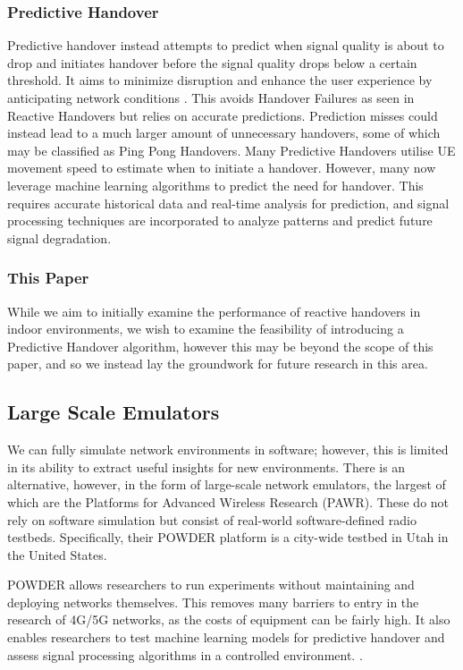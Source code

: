 \subsubsection*{Predictive Handover} Predictive handover instead attempts to predict when signal quality is about to drop and initiates handover before the signal quality drops below a certain threshold. It aims to minimize disruption and enhance the user experience by anticipating network conditions \cite{Al-Quraan2023Enhancing}. This avoids Handover Failures as seen in Reactive Handovers but relies on accurate predictions. Prediction misses could instead lead to a much larger amount of unnecessary handovers, some of which may be classified as Ping Pong Handovers.  Many Predictive Handovers utilise UE movement speed to estimate when to initiate a handover. However, many now leverage machine learning algorithms to predict the need for handover. This requires accurate historical data and real-time analysis for prediction, and signal processing techniques are incorporated to analyze patterns and predict future signal degradation.

\subsubsection*{This Paper} While we aim to initially examine the performance of reactive handovers in indoor environments, we wish to examine the feasibility of introducing a Predictive Handover algorithm, however this may be beyond the scope of this paper, and so we instead lay the groundwork for future research in this area.

\subsection{Large Scale Emulators}
We can fully simulate network environments in software; however, this is limited in its ability to extract useful insights for new environments. There is an alternative, however, in the form of large-scale network emulators, the largest of which are the Platforms for Advanced Wireless Research (PAWR). These do not rely on software simulation but consist of real-world software-defined radio testbeds. Specifically, their POWDER platform is a city-wide testbed in Utah in the United States. 

POWDER allows researchers to run experiments without maintaining and deploying networks themselves. This removes many barriers to entry in the research of 4G/5G networks, as the costs of equipment can be fairly high. It also enables researchers to test machine learning models for predictive handover and assess signal processing algorithms in a controlled environment.   \cite{Rusca2023MobileRF}.

